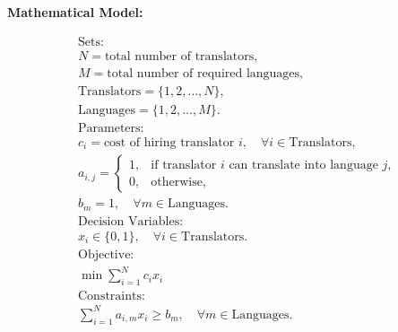\documentclass{article}
\begin{document}
\textbf{Mathematical Model:}

\begin{align*}
    &\text{Sets:} \\
    &N = \text{total number of translators}, \\
    &M = \text{total number of required languages}, \\
    &\text{Translators} = \{1, 2, \ldots, N\}, \\
    &\text{Languages} = \{1, 2, \ldots, M\}. \\

    &\text{Parameters:} \\
    &c_i = \text{cost of hiring translator } i, \quad \forall i \in \text{Translators}, \\
    &a_{i,j} = 
    \begin{cases} 
    1, & \text{if translator } i \text{ can translate into language } j, \\
    0, & \text{otherwise},
    \end{cases}
    \\
    &b_m = 1, \quad \forall m \in \text{Languages}. \\

    &\text{Decision Variables:} \\
    &x_i \in \{0, 1\}, \quad \forall i \in \text{Translators}. \\

    &\text{Objective:} \\
    &\min \sum_{i=1}^N c_i x_i \\

    &\text{Constraints:} \\
    &\sum_{i=1}^N a_{i,m} x_i \geq b_m, \quad \forall m \in \text{Languages}.
\end{align*}
\end{document}
